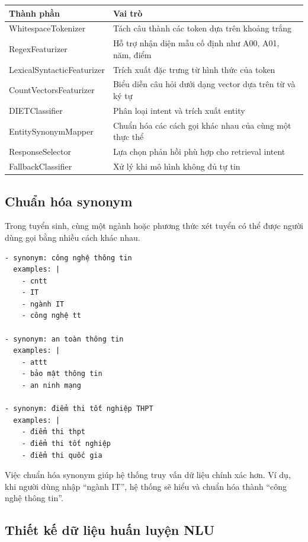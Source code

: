 \begin{table}[H]
\centering
\begin{tabular}{|l|p{9cm}|}
\hline
\textbf{Thành phần} & \textbf{Vai trò} \\
\hline
WhitespaceTokenizer & Tách câu thành các token dựa trên khoảng trắng \\
\hline
RegexFeaturizer & Hỗ trợ nhận diện mẫu cố định như A00, A01, năm, điểm \\
\hline
LexicalSyntacticFeaturizer & Trích xuất đặc trưng từ hình thức của token \\
\hline
CountVectorsFeaturizer & Biểu diễn câu hỏi dưới dạng vector dựa trên từ và ký tự \\
\hline
DIETClassifier & Phân loại intent và trích xuất entity \\
\hline
EntitySynonymMapper & Chuẩn hóa các cách gọi khác nhau của cùng một thực thể \\
\hline
ResponseSelector & Lựa chọn phản hồi phù hợp cho retrieval intent \\
\hline
FallbackClassifier & Xử lý khi mô hình không đủ tự tin \\
\hline
\end{tabular}
\end{table}

\subsection*{Chuẩn hóa synonym}

Trong tuyển sinh, cùng một ngành hoặc phương thức xét tuyển có thể được người dùng gọi bằng nhiều cách khác nhau.

\begin{verbatim}
- synonym: công nghệ thông tin
  examples: |
    - cntt
    - IT
    - ngành IT
    - công nghệ tt

- synonym: an toàn thông tin
  examples: |
    - attt
    - bảo mật thông tin
    - an ninh mạng

- synonym: điểm thi tốt nghiệp THPT
  examples: |
    - điểm thi thpt
    - điểm thi tốt nghiệp
    - điểm thi quốc gia
\end{verbatim}

Việc chuẩn hóa synonym giúp hệ thống truy vấn dữ liệu chính xác hơn. Ví dụ, khi người dùng nhập ``ngành IT'', hệ thống sẽ hiểu và chuẩn hóa thành ``công nghệ thông tin''.

\subsection*{Thiết kế dữ liệu huấn luyện NLU}

